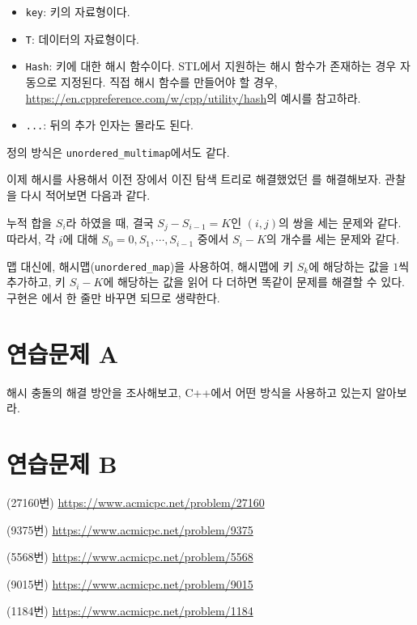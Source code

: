 \begin{itemize}
    \item \texttt{key}: 키의 자료형이다.
    \item \texttt{T}: 데이터의 자료형이다.
    \item \texttt{Hash}: 키에 대한 해시 함수이다. STL에서 지원하는 해시 함수가 존재하는 경우 자동으로 지정된다. 직접 해시 함수를 만들어야 할 경우, \url{https://en.cppreference.com/w/cpp/utility/hash}의 예시를 참고하라.
    \item \texttt{...}: 뒤의 추가 인자는 몰라도 된다.
\end{itemize}

정의 방식은 \texttt{unordered\_multimap}에서도 같다.

이제 해시를 사용해서 이전 장에서 이진 탐색 트리로 해결했었던 를 해결해보자. 관찰을 다시 적어보면 다음과 같다.

\begin{obs}
    누적 합을 $S_i$라 하였을 때, 결국 $S_j - S_{i-1} = K$인 $(i, j)$의 쌍을 세는 문제와 같다. 따라서, 각 $i$에 대해 $S_0 = 0, S_1, \cdots, S_{i-1}$ 중에서 $S_i - K$의 개수를 세는 문제와 같다.
\end{obs}

맵 대신에, 해시맵(\texttt{unordered\_map})을 사용하여, 해시맵에 키 $S_k$에 해당하는 값을 $1$씩 추가하고, 키 $S_i - K$에 해당하는 값을 읽어 다 더하면 똑같이 문제를 해결할 수 있다. 구현은 에서 한 줄만 바꾸면 되므로 생략한다.

\section{연습문제 A}
\begin{problem} 
    해시 충돌의 해결 방안을 조사해보고, C++에서 어떤 방식을 사용하고 있는지 알아보라.
\end{problem}

\section{연습문제 B}
\begin{problem}
    (27160번) \url{https://www.acmicpc.net/problem/27160}
\end{problem}
\begin{problem}
    (9375번) \url{https://www.acmicpc.net/problem/9375}
\end{problem}
\begin{problem}
    (5568번) \url{https://www.acmicpc.net/problem/5568}
\end{problem}
\begin{problem}
    (9015번) \url{https://www.acmicpc.net/problem/9015}
\end{problem}
\begin{problem}
    (1184번) \url{https://www.acmicpc.net/problem/1184}
\end{problem}


